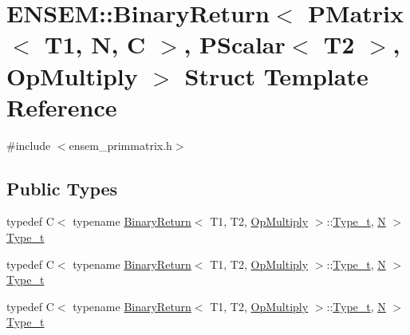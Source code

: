 \hypertarget{structENSEM_1_1BinaryReturn_3_01PMatrix_3_01T1_00_01N_00_01C_01_4_00_01PScalar_3_01T2_01_4_00_01OpMultiply_01_4}{}\section{E\+N\+S\+EM\+:\+:Binary\+Return$<$ P\+Matrix$<$ T1, N, C $>$, P\+Scalar$<$ T2 $>$, Op\+Multiply $>$ Struct Template Reference}
\label{structENSEM_1_1BinaryReturn_3_01PMatrix_3_01T1_00_01N_00_01C_01_4_00_01PScalar_3_01T2_01_4_00_01OpMultiply_01_4}


{\ttfamily \#include $<$ensem\+\_\+primmatrix.\+h$>$}

\subsection*{Public Types}
\begin{DoxyCompactItemize}
\item 
typedef C$<$ typename \mbox{\hyperlink{structENSEM_1_1BinaryReturn}{Binary\+Return}}$<$ T1, T2, \mbox{\hyperlink{structENSEM_1_1OpMultiply}{Op\+Multiply}} $>$\+::\mbox{\hyperlink{structENSEM_1_1BinaryReturn_3_01PMatrix_3_01T1_00_01N_00_01C_01_4_00_01PScalar_3_01T2_01_4_00_01OpMultiply_01_4_a76b005be131c57afb03cbe700dbc4672}{Type\+\_\+t}}, \mbox{\hyperlink{adat__devel_2lib_2hadron_2operator__name__util_8cc_a7722c8ecbb62d99aee7ce68b1752f337}{N}} $>$ \mbox{\hyperlink{structENSEM_1_1BinaryReturn_3_01PMatrix_3_01T1_00_01N_00_01C_01_4_00_01PScalar_3_01T2_01_4_00_01OpMultiply_01_4_a76b005be131c57afb03cbe700dbc4672}{Type\+\_\+t}}
\item 
typedef C$<$ typename \mbox{\hyperlink{structENSEM_1_1BinaryReturn}{Binary\+Return}}$<$ T1, T2, \mbox{\hyperlink{structENSEM_1_1OpMultiply}{Op\+Multiply}} $>$\+::\mbox{\hyperlink{structENSEM_1_1BinaryReturn_3_01PMatrix_3_01T1_00_01N_00_01C_01_4_00_01PScalar_3_01T2_01_4_00_01OpMultiply_01_4_a76b005be131c57afb03cbe700dbc4672}{Type\+\_\+t}}, \mbox{\hyperlink{adat__devel_2lib_2hadron_2operator__name__util_8cc_a7722c8ecbb62d99aee7ce68b1752f337}{N}} $>$ \mbox{\hyperlink{structENSEM_1_1BinaryReturn_3_01PMatrix_3_01T1_00_01N_00_01C_01_4_00_01PScalar_3_01T2_01_4_00_01OpMultiply_01_4_a76b005be131c57afb03cbe700dbc4672}{Type\+\_\+t}}
\item 
typedef C$<$ typename \mbox{\hyperlink{structENSEM_1_1BinaryReturn}{Binary\+Return}}$<$ T1, T2, \mbox{\hyperlink{structENSEM_1_1OpMultiply}{Op\+Multiply}} $>$\+::\mbox{\hyperlink{structENSEM_1_1BinaryReturn_3_01PMatrix_3_01T1_00_01N_00_01C_01_4_00_01PScalar_3_01T2_01_4_00_01OpMultiply_01_4_a76b005be131c57afb03cbe700dbc4672}{Type\+\_\+t}}, \mbox{\hyperlink{adat__devel_2lib_2hadron_2operator__name__util_8cc_a7722c8ecbb62d99aee7ce68b1752f337}{N}} $>$ \mbox{\hyperlink{structENSEM_1_1BinaryReturn_3_01PMatrix_3_01T1_00_01N_00_01C_01_4_00_01PScalar_3_01T2_01_4_00_01OpMultiply_01_4_a76b005be131c57afb03cbe700dbc4672}{Type\+\_\+t}}
\end{DoxyCompactItemize}


